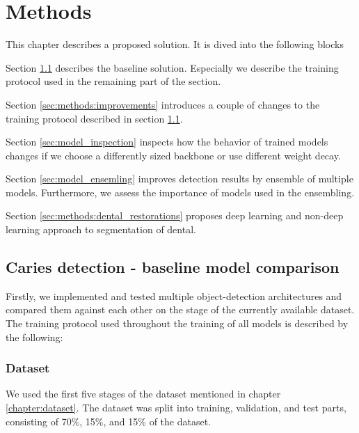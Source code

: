 \chapter{Methods}
\label{chapter:methods}
This chapter describes a proposed solution. It is dived into the following blocks

Section \ref{sec:caries_detection} describes the baseline solution. Especially we describe the training protocol used in the remaining part of the section.

Section \ref{sec:methods:improvements} introduces a couple of changes to the training protocol described in section \ref{sec:caries_detection}.

Section \ref{sec:model_inspection} inspects how the behavior of trained models changes if we choose a differently sized backbone or use different weight decay.

Section \ref{sec:model_ensemling} improves detection results by ensemble of multiple models. Furthermore, we assess the importance of models used in the ensembling.

Section \ref{sec:methods:dental_restorations} proposes deep learning and non-deep learning approach to segmentation of dental.

\section{Caries detection - baseline model comparison}
\label{sec:caries_detection}

Firstly, we implemented and tested multiple object-detection architectures and compared them against each other on the stage of the currently available dataset. The training protocol used throughout the training of all models is described by the following:

\subsection{Dataset}
We used the first five stages of the dataset mentioned in chapter \ref{chapter:dataset}. The dataset was split into training, validation, and test parts, consisting of 70\%, 15\%, and 15\% of the dataset.

